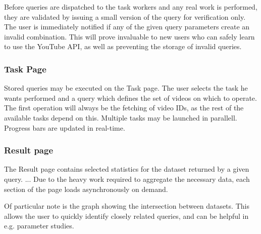 Before queries are dispatched to the task workers and any real work is
performed, they are validated by issuing a small version of the query for
verification only. The user is immediately notified if any of the given query
parameters create an invalid combination. This will prove invaluable to new
users who can safely learn to use the YouTube API, as well as preventing
the storage of invalid queries.


\subsubsection{Task Page}
Stored queries may be executed on the Task page. The user selects the task he
wants performed and a query which defines the set of videos on which to operate.
The first operation will always be the fetching of video IDs, as the rest of the
available tasks depend on this. Multiple tasks may be launched in parallell.
Progress bars are updated in real-time. %


\subsubsection{Result page}
The Result page contains selected statistics for the dataset returned by a given
query.
...
Due to the heavy work required to aggregate the necessary data, each section of
the page loads asynchronously on demand.

Of particular note is the graph showing the intersection between datasets. This
allows the user to quickly identify closely related queries, and can be helpful
in e.g. parameter studies.


